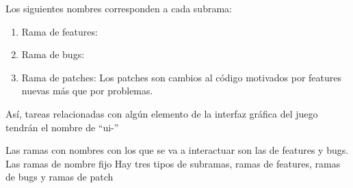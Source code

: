
Los siguientes nombres corresponden a cada subrama:
\begin{enumerate}
\item Rama de features: 
\item Rama de bugs: 
\item Rama de patches: 
Los patches son cambios al código motivados por features nuevas más que por problemas.
\end{enumerate}

Así, tareas relacionadas con algún elemento de la interfaz gráfica del juego tendrán el nombre de “ui-”

Las ramas con nombres con los que se va a interactuar son las de features y bugs.
Las ramas de nombre fijo
Hay tres tipos de subramas, ramas de features, ramas de bugs y ramas de patch
